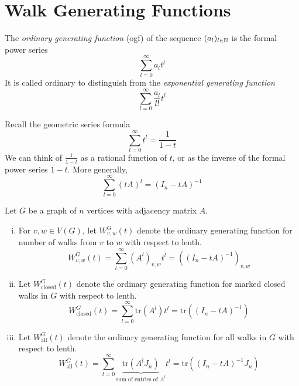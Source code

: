 \section{Walk Generating Functions}
\begin{definition}
The \emph{ordinary generating function} (ogf) of the sequence \((a_l)_{l\in\mathbb{N}}\) is the formal power series
\[ \sum_{l=0}^\infty a_l t^l \]
It is called ordinary to distinguish from the \emph{exponential generating function}
\[ \sum_{l=0}^\infty \frac{a_l}{l!} t^l \]
\end{definition}
Recall the geometric series formula
\[ \sum_{l=0}^\infty t^l=\frac{1}{1-t} \]
We can think of \(\frac{1}{1-t}\) as a rational function of \(t\), or as the inverse of the formal power series \(1-t\).
More generally,
\[ \sum_{l=0}^\infty (tA)^l=(I_n-tA)^{-1} \]


\begin{definition}
Let \(G\) be a graph of \(n\) vertices with adjacency matrix \(A\).
\begin{enumerate}[(i)]
\item For \(v,w\in V(G)\), let \(W_{v,w}^G(t)\) denote the ordinary generating function for number of walks from \(v\) to \(w\) with respect to lenth.
\[ W_{v,w}^G(t)=\sum_{l=0}^\infty (A^l)_{v,w}t^l=\left((I_n-tA)^{-1}\right)_{v,w} \]
\item Let \(W_{\text{closed}}^G(t)\) denote the ordinary generating function for marked closed walks in \(G\) with respect to lenth.
\[ W_{\text{closed}}^G(t)=\sum_{l=0}^\infty \mathrm{tr}(A^l)t^l=\mathrm{tr}\left((I_n-tA)^{-1}\right) \]
\item Let \(W_{\text{all}}^G(t)\) denote the ordinary generating function for all walks in \(G\) with respect to lenth.
\[ W_{\text{all}}^G(t)=\sum_{l=0}^\infty \underbrace{\mathrm{tr}(A^lJ_n)}_{\text{sum of entries of }A^l}t^l=\mathrm{tr}\left((I_n-tA)^{-1}J_n\right) \]
\end{enumerate}
\end{definition}